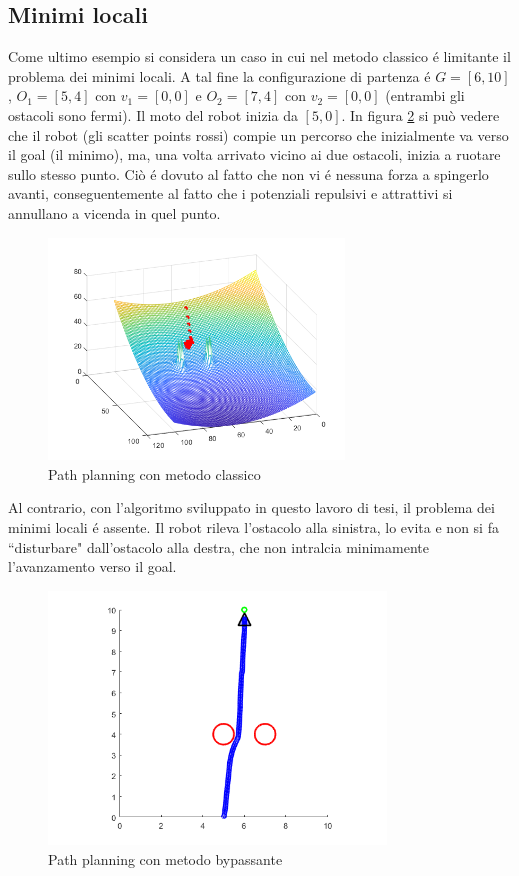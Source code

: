 \documentclass[14pt,a4paper]{extarticle}
\begin{document}
\subsection{Minimi locali}
Come ultimo esempio si considera un caso in cui nel metodo classico é limitante il problema dei minimi locali. A tal fine la configurazione di partenza é \(G = [6,10]\), \(O_1=[5,4]\) con \(v_1=[0,0]\) e \(O_2=[7,4]\) con \(v_2=[0,0]\) (entrambi gli ostacoli sono fermi). Il moto del robot inizia da \([5,0]\). In figura \ref{minimolocalesim} si può vedere che il robot (gli scatter points rossi) compie un percorso che inizialmente va verso il goal (il minimo), ma, una volta arrivato vicino ai due ostacoli, inizia a ruotare sullo stesso punto. Ciò é dovuto al fatto che non vi é nessuna forza a spingerlo avanti, conseguentemente al fatto che i potenziali repulsivi e attrattivi si annullano a vicenda in quel punto.
\begin{figure}[H]
\centering
\includegraphics[width=0.7\textwidth]{minimolocalesim.png}
\caption{Path planning con metodo classico}
\label{minimolocalesim}
\end{figure}
Al contrario, con l'algoritmo sviluppato in questo lavoro di tesi, il problema dei minimi locali é assente. Il robot rileva l'ostacolo alla sinistra, lo evita e non si fa ``disturbare" dall'ostacolo alla destra, che non intralcia minimamente l'avanzamento verso il goal.  
\begin{figure}[H]
\centering
\includegraphics[width=0.8\textwidth]{nominimolocalesim.png}
\caption{Path planning con metodo bypassante}
\label{minimolocalesim}
\end{figure}
\end{document}
